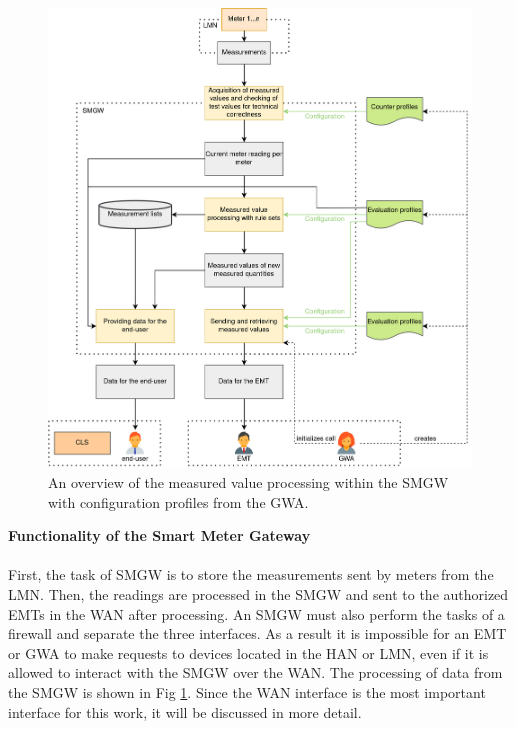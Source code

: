 \begin{figure}[tbp]
  \centering
  \includegraphics[width=1\textwidth]{images/MessverarbeitungEnglish2.png}
  \caption[Measured Value Processing in a SMGW]{An overview of the measured value processing within the \gls{SMGW} with configuration profiles from the GWA.}
  \label{fig:value_processing}
\end{figure}
\textbf{Functionality of the Smart Meter Gateway}
\\
\\
First, the task of \gls{SMGW} is to store the measurements sent by meters from the \gls{LMN}. Then, the readings are processed in the \gls{SMGW} and sent to the authorized \gls{EMT}s in the \gls{WAN} after processing. An \gls{SMGW} must also perform the tasks of a firewall and separate the three interfaces. As a result it is impossible for an \gls{EMT} or \gls{GWA} to make requests to devices located in the \gls{HAN} or \gls{LMN}, even if it is allowed to interact with the \gls{SMGW} over the \gls{WAN}. The processing of data from the \gls{SMGW} is shown in Fig \ref{fig:value_processing}. Since the \gls{WAN} interface is the most important interface for this work, it will be discussed in more detail.\\
\\

